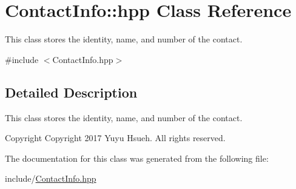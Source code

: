 \hypertarget{classContactInfo_1_1hpp}{}\section{Contact\+Info\+:\+:hpp Class Reference}
\label{classContactInfo_1_1hpp}


This class stores the identity, name, and number of the contact.  




{\ttfamily \#include $<$Contact\+Info.\+hpp$>$}



\subsection{Detailed Description}
This class stores the identity, name, and number of the contact. 

\begin{DoxyCopyright}{Copyright}
Copyright 2017 Yuyu Hsueh. All rights reserved. 
\end{DoxyCopyright}


The documentation for this class was generated from the following file\+:\begin{DoxyCompactItemize}
\item 
include/\hyperlink{ContactInfo_8hpp}{Contact\+Info.\+hpp}\end{DoxyCompactItemize}

